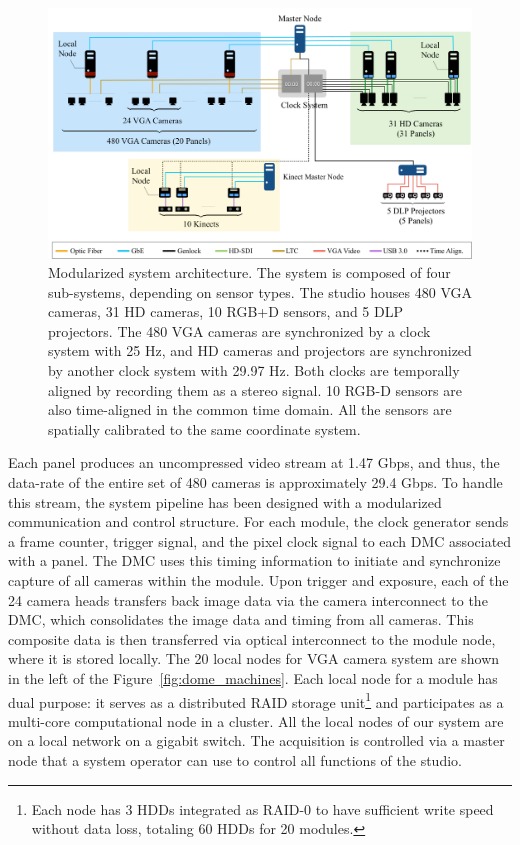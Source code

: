 \begin{figure}[t]
	\includegraphics[width=\linewidth]{fig_system/panoptic_architecture}
	\caption{Modularized system architecture. The system is composed of four sub-systems, depending on sensor types. The studio houses 480 VGA cameras, 31 HD cameras, 10 RGB+D sensors, and 5 DLP projectors. The 480 VGA cameras are synchronized by a clock system with 25 Hz, and HD cameras and projectors are synchronized by another clock system with 29.97 Hz. Both clocks are temporally aligned by recording them as a stereo signal. 10 RGB-D sensors are also time-aligned in the common time domain. All the sensors are spatially calibrated to the same coordinate system.}
	\label{fig:dome_architecture}
\end{figure}

Each panel produces an uncompressed video stream at 1.47 Gbps, and thus, the data-rate of the entire set of 480 cameras is approximately 29.4 Gbps. To handle this stream, the system pipeline has been designed with a modularized communication and control structure. For each module, the clock generator sends a frame counter, trigger signal, and the pixel clock signal to each DMC associated with a panel. The DMC uses this timing information to initiate and synchronize capture of all cameras within the module. Upon trigger and exposure, each of the 24 camera heads transfers back image data via the camera interconnect to the DMC, which consolidates the image data and timing from all cameras. This composite data is then transferred via optical interconnect to the module node, where it is stored locally. The 20 local nodes for VGA camera system are shown in the left of the Figure~\ref{fig:dome_machines}. Each local node for a module has dual purpose: it serves as a distributed RAID storage unit\footnote{Each node has 3 HDDs integrated as RAID-0 to have sufficient write speed without data loss, totaling 60 HDDs for 20 modules.} and participates as a multi-core computational node in a cluster. All the local nodes of our system are on a local network on a gigabit switch. The acquisition is controlled via a master node that a system operator can use to control all functions of the studio.


